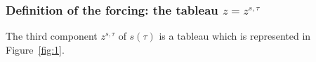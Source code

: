 \documentclass[
twoside,
]{article}
\newtheorem{proposition}[theorem]{Proposition}
\theoremstyle{definition}
\newtheorem{definition}[theorem]{Definition}
\theoremstyle{remark}
\DeclareMathOperator{\otp}{otp}
\newcommand{\cut}{{\vert}}
\newcommand{\set}[1]{\{\,#1\,\}}
\begin{document}
\subsubsection{Definition of the forcing: the tableau $z=z^{s,\tau}$}
The third component $z^{s,\tau}$ of $s(\tau)$ is a tableau which is represented
in  Figure~\ref{fig:1}.    
\begin{comment}
  Before defining this, we introduce a slight variation on standard
  notation:
  \begin{definition}
    \label{def:squarekappa}
    We write $[X]^{*\kappa}$ for the set of pairs $(x,\prec)$ such
    that $x\subseteq X$ and $\prec$ is a well ordering of $x$ of
    length at most $\kappa$.  If
    $(x',\prec'),(x,\prec)\in [X]^{*\kappa}$ then we write
    $(x',\prec')\supseteq(x,\prec)$ if $x'\supseteq x$ and
    ${\prec} = {\prec'}\cap (x\times x)$.

    If $\gamma<\kappa$ and $(x,\prec)\in [X]^{*\kappa}$ then we write
    $x\cut\gamma$ for the $\prec$-initial segment of $x$ of length
    $\gamma$.
  \end{definition}
  \begin{proposition}\label{thm:squarekappacomplete}
    Suppose that $(x_{\xi},\prec_{\xi})\in [X]^{*\kappa}$ for all
    $\xi<\gamma$,
    $(x_\xi,\prec_{\xi})\subseteq (x_{\xi'},\prec_{\xi'})$ for
    $\xi<\xi'<\gamma$, and either $\gamma<\kappa$ or $\gamma=\kappa$
    and
    \begin{equation*}
      \forall\xi<\gamma\exists\xi'\forall \xi''>\xi'\forall a'\in (x_{\xi''}\setminus
      x_{\xi'}) \; a\prec_{\xi''}a'.
    \end{equation*}
    Then
    $(x,\prec)=(\bigcup_{\xi<\gamma}x_{\xi},
    \bigcup_{\xi<\gamma}\prec_{\xi})\in[X]^{*\kappa}$,
    and $(x,\prec)\supseteq (x_{\xi},\prec_{\xi})$ for all
    $\xi<\gamma$.
  \end{proposition}
  We will normally refer to a pair $(x,\prec)\in [X]^{*\kappa}$ by its
  first member $x$, leaving the ordering $\prec$ understood.  The
  purpose of the ordering is as follows: fix an
  $x\in[\kappa^+]^{*\kappa}$ and let $U$ be the ultrafilter
  $\set{z\subseteq V_\kappa\mid x\in i^E(z)}$.  Then there is a set
  $A\in U$ such that for any $z\in A$, if we set
  $\lambda=\otp(\prec_{z})$ then $z\in[\lambda^{+}]^{*\lambda}$ and we
  have a natural one to one map from $z'$ onto $x\cut\lambda$.  This
  map will be needed in the Definition~\ref{def:one-step} of the
  one-step extension.
\end{comment}
\end{document}
